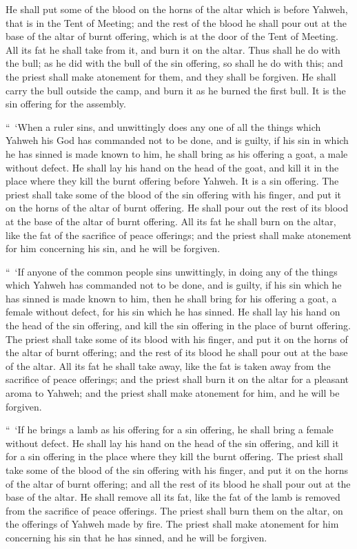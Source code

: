 {He shall put some of the blood on the horns of the altar which is before Yahweh, that is in the Tent of Meeting; and the rest of the blood he shall pour out at the base of the altar of burnt offering, which is at the door of the Tent of Meeting.
All its fat he shall take from it, and burn it on the altar.
Thus shall he do with the bull; as he did with the bull of the sin offering, so shall he do with this; and the priest shall make atonement for them, and they shall be forgiven.
He shall carry the bull outside the camp, and burn it as he burned the first bull. It is the sin offering for the assembly.
\par }{\PP {}“ ‘When a ruler sins, and unwittingly does any one of all the things which Yahweh his God has commanded not to be done, and is guilty,
if his sin in which he has sinned is made known to him, he shall bring as his offering a goat, a male without defect.
He shall lay his hand on the head of the goat, and kill it in the place where they kill the burnt offering before Yahweh. It is a sin offering.
The priest shall take some of the blood of the sin offering with his finger, and put it on the horns of the altar of burnt offering. He shall pour out the rest of its blood at the base of the altar of burnt offering.
All its fat he shall burn on the altar, like the fat of the sacrifice of peace offerings; and the priest shall make atonement for him concerning his sin, and he will be forgiven.
\par }{\PP {}“ ‘If anyone of the common people sins unwittingly, in doing any of the things which Yahweh has commanded not to be done, and is guilty,
if his sin which he has sinned is made known to him, then he shall bring for his offering a goat, a female without defect, for his sin which he has sinned.
He shall lay his hand on the head of the sin offering, and kill the sin offering in the place of burnt offering.
The priest shall take some of its blood with his finger, and put it on the horns of the altar of burnt offering; and the rest of its blood he shall pour out at the base of the altar.
All its fat he shall take away, like the fat is taken away from the sacrifice of peace offerings; and the priest shall burn it on the altar for a pleasant aroma to Yahweh; and the priest shall make atonement for him, and he will be forgiven.
\par }{\PP {}“ ‘If he brings a lamb as his offering for a sin offering, he shall bring a female without defect.
He shall lay his hand on the head of the sin offering, and kill it for a sin offering in the place where they kill the burnt offering.
The priest shall take some of the blood of the sin offering with his finger, and put it on the horns of the altar of burnt offering; and all the rest of its blood he shall pour out at the base of the altar.
He shall remove all its fat, like the fat of the lamb is removed from the sacrifice of peace offerings. The priest shall burn them on the altar, on the offerings of Yahweh made by fire. The priest shall make atonement for him concerning his sin that he has sinned, and he will be forgiven.

}
